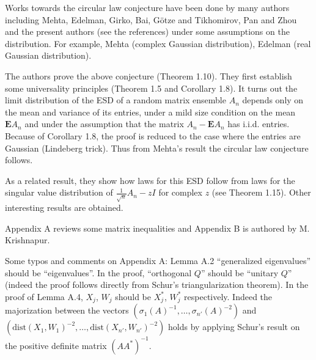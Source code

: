 \documentclass{zbMATH}
\begin{document}
Works towards the circular law conjecture have been done by many authors including Mehta, Edelman, Girko, Bai, Götze and Tikhomirov, Pan and Zhou and the present authors (see the references) under some assumptions on the distribution. For example, Mehta (complex Gaussian distribution), Edelman (real Gaussian distribution).

The authors prove the above conjecture (Theorem 1.10). They first establish some universality principles (Theorem 1.5 and Corollary 1.8). It turns out the limit distribution of the ESD of a random matrix ensemble \(A_n\) depends only on the mean and variance of its entries, under a mild size condition on the mean \({\mathbf E}A_n\) and under the assumption that the matrix \(A_n-{\mathbf E}A_n\) has i.i.d. entries. Because of Corollary 1.8, the proof is reduced to the case where the entries are Gaussian (Lindeberg trick). Thus from Mehta's result the circular law conjecture follows.

As a related result, they show how laws for this ESD follow from laws for the singular value distribution of \(\frac 1{\sqrt n}A_n-zI\) for complex \(z\) (see Theorem 1.15). Other interesting results are obtained.

Appendix A reviews some matrix inequalities and Appendix B is authored by M. Krishnapur.

Some typos and comments on Appendix A: Lemma A.2 ``generalized eigenvalues'' should be ``eigenvalues''. In the proof, ``orthogonal \(Q\)'' should be ``unitary \(Q\)'' (indeed the proof follows directly from Schur's triangularization theorem). In the proof of Lemma A.4, \(X_j\), \(W_j\) should be \(X_j^*\), \(W_j^*\) respectively. Indeed the majorization between the vectors \((\sigma_1(A)^{-1},\dots , \sigma_{n'}(A)^{-2})\) and \((\text{dist} (X_1,W_1)^{-2}, \dots, \text{dist} (X_{n'},W_{n'})^{-2})\) holds by applying Schur's result on the positive definite matrix \((AA^*)^{-1}\).



\end{document}
